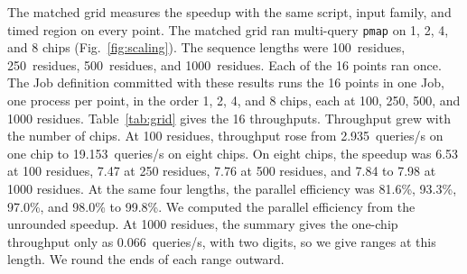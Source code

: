 The matched grid measures the speedup with the same script, input family, and timed region on every point.
The matched grid ran multi-query \texttt{pmap} on 1, 2, 4, and 8 chips (Fig.~\ref{fig:scaling}). The sequence lengths were 100~residues, 250~residues, 500~residues, and 1000~residues. %
Each of the 16 points ran once. %
The Job definition committed with these results runs the 16 points in one Job, one process per point, in the order 1, 2, 4, and 8 chips, each at 100, 250, 500, and 1000 residues. %
Table~\ref{tab:grid} gives the 16 throughputs. Throughput grew with the number of chips. %
At 100 residues, throughput rose from 2.935~queries/s on one chip to 19.153~queries/s on eight chips. %
On eight chips, the speedup was 6.53 at 100 residues, 7.47 at 250 residues, 7.76 at 500 residues, and 7.84 to 7.98 at 1000 residues. %
At the same four lengths, the parallel efficiency was 81.6\%, 93.3\%, 97.0\%, and 98.0\% to 99.8\%. %
We computed the parallel efficiency from the unrounded speedup.
At 1000 residues, the summary gives the one-chip throughput only as 0.066~queries/s, with two digits, so we give ranges at this length. %
We round the ends of each range outward. %

